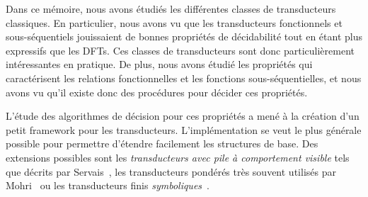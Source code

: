 Dans ce mémoire, nous avons étudiés les différentes classes de transducteurs classiques. En particulier, nous avons vu que les transducteurs fonctionnels et sous-séquentiels jouissaient de bonnes propriétés de décidabilité tout en étant plus expressifs que les DFTs. Ces classes de transducteurs sont donc particulièrement intéressantes en pratique. De plus, nous avons étudié les propriétés qui caractérisent les relations fonctionnelles et les fonctions sous-séquentielles, et nous avons vu qu'il existe donc des procédures pour décider ces propriétés.

L'étude des algorithmes de décision pour ces propriétés a mené à la création d'un petit framework pour les transducteurs. L'implémentation se veut le plus générale possible pour permettre d'étendre facilement les structures de base. Des extensions possibles sont les \emph{transducteurs avec pile à comportement visible} tels que décrits par Servais~\cite{Ser11}, les transducteurs pondérés très souvent utilisés par Mohri~\cite{Am03} ou les transducteurs finis \emph{symboliques}~\cite{AMV13}.